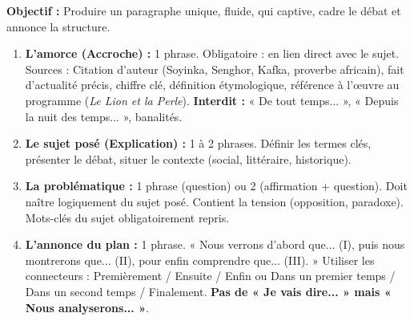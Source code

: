 \documentclass[11pt]{article}
\newcommand{\cle}[1]{{\popxbold\color{popdark}#1}}
\begin{document}
\begin{methode}
\textbf{Objectif :} Produire un paragraphe unique, fluide, qui captive, cadre le débat et annonce la structure.
\begin{enumerate}
    \item \textbf{L'amorce (Accroche) :} 1 phrase. \cle{Obligatoire :} en lien direct avec le sujet. Sources : Citation d'auteur (Soyinka, Senghor, Kafka, proverbe africain), fait d'actualité précis, chiffre clé, définition étymologique, référence à l'œuvre au programme (\emph{Le Lion et la Perle}). \textbf{Interdit :} « De tout temps... », « Depuis la nuit des temps... », banalités.
    \item \textbf{Le sujet posé (Explication) :} 1 à 2 phrases. Définir les termes clés, présenter le débat, situer le contexte (social, littéraire, historique).
    \item \textbf{La problématique :} 1 phrase (question) ou 2 (affirmation + question). Doit naître logiquement du sujet posé. Contient la tension (opposition, paradoxe). \cle{Mots-clés du sujet obligatoirement repris}.
    \item \textbf{L'annonce du plan :} 1 phrase. « Nous verrons d'abord que... (I), puis nous montrerons que... (II), pour enfin comprendre que... (III). » Utiliser les connecteurs : \cle{Premièrement / Ensuite / Enfin} ou \cle{Dans un premier temps / Dans un second temps / Finalement}. \textbf{Pas de « Je vais dire... » mais « Nous analyserons... »}.
\end{enumerate}
\end{methode}
\end{document}
